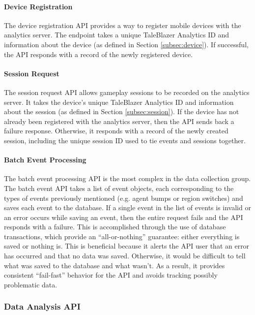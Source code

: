\paragraph{Device Registration}

The device registration API provides a way to register mobile devices with the analytics server. The endpoint takes a unique TaleBlazer Analytics ID and information about the device (as defined in Section \ref{subsec:device}). If successful, the API responds with a record of the newly registered device.

\paragraph{Session Request}

The session request API allows gameplay sessions to be recorded on the analytics server. It takes the device's unique TaleBlazer Analytics ID and information about the session (as defined in Section \ref{subsec:session}). If the device has not already been registered with the analytics server, then the API sends back a failure response. Otherwise, it responds with a record of the newly created session, including the unique session ID used to tie events and sessions together.

\paragraph{Batch Event Processing}

The batch event processing API is the most complex in the data collection group. The batch event API takes a list of event objects, each corresponding to the types of events previously mentioned (e.g. agent bumps or region switches) and saves each event to the database. If a single event in the list of events is invalid or an error occurs while saving an event, then the entire request fails and the API responds with a failure. This is accomplished through the use of database transactions, which provide an ``all-or-nothing'' guarantee: either everything is saved or nothing is. This is beneficial because it alerts the API user that an error has occurred and that no data was saved. Otherwise, it would be difficult to tell what was saved to the database and what wasn't. As a result, it provides consistent ``fail-fast'' behavior for the API and avoids tracking possibly problematic data.

\subsubsection{Data Analysis API}
\label{subsec:analysis_api}

